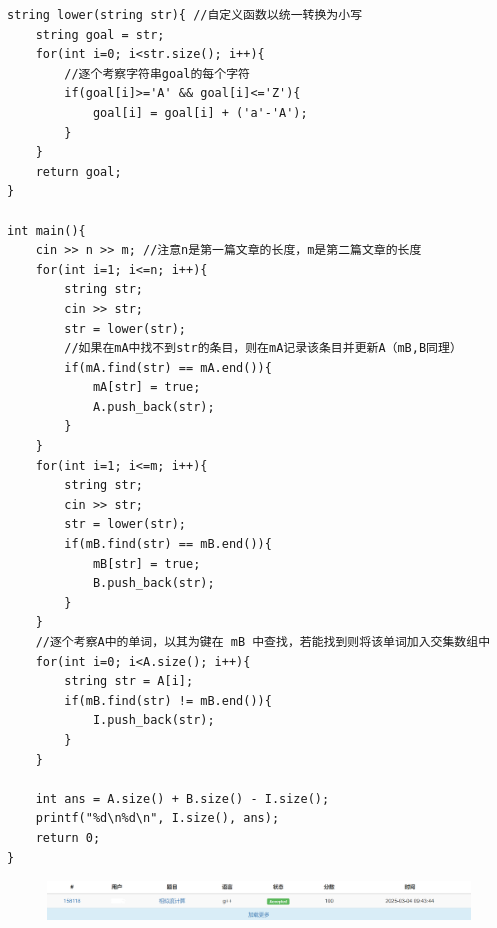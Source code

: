 \documentclass[UTF8]{ctexart}
\begin{document}
{\begin{lstlisting}
string lower(string str){ //自定义函数以统一转换为小写
	string goal = str;
	for(int i=0; i<str.size(); i++){
		//逐个考察字符串goal的每个字符
		if(goal[i]>='A' && goal[i]<='Z'){
			goal[i] = goal[i] + ('a'-'A');
		}
	}
	return goal;
}

int main(){
	cin >> n >> m; //注意n是第一篇文章的长度，m是第二篇文章的长度
	for(int i=1; i<=n; i++){
		string str;
		cin >> str;
		str = lower(str);
		//如果在mA中找不到str的条目，则在mA记录该条目并更新A（mB,B同理）
		if(mA.find(str) == mA.end()){
			mA[str] = true;
			A.push_back(str);
		}
	}
	for(int i=1; i<=m; i++){
		string str;
		cin >> str;
		str = lower(str);
		if(mB.find(str) == mB.end()){
			mB[str] = true;
			B.push_back(str);
		}
	}
	//逐个考察A中的单词，以其为键在 mB 中查找，若能找到则将该单词加入交集数组中
	for(int i=0; i<A.size(); i++){
		string str = A[i];
		if(mB.find(str) != mB.end()){
			I.push_back(str);
		}
	}
	
	int ans = A.size() + B.size() - I.size();
	printf("%d\n%d\n", I.size(), ans);
	return 0;
}
\end{lstlisting}

\begin{figure}[htb]
    \centering
    \includegraphics[width=\textwidth]{运行结果.png}
\end{figure}

}
\end{document}
